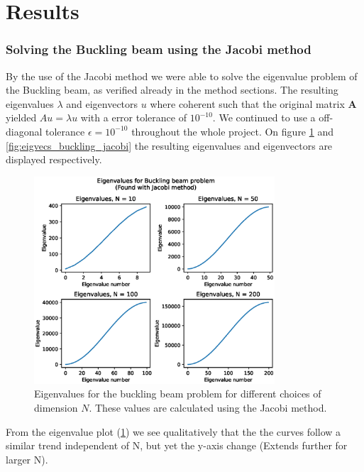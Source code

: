 \documentclass[american,a4paper,12pt]{article}
\renewcommand{\vec}[1]{\mathbf{#1}} %
\begin{document}
\section{Results}
\subsubsection*{Solving the Buckling beam using the Jacobi method}
By the use of the Jacobi method we were able to solve the eigenvalue problem of the Buckling beam, as verified already in the method sections. The resulting eigenvalues $\lambda$ and eigenvectors $u$ where coherent such that the original matrix $\vec{A}$ yielded $Au = \lambda u$ with a error tolerance of $10^{-10}$. We continued to use a off-diagonal tolerance $\epsilon = 10^{-10}$ throughout the whole project. On figure \ref{fig:eigvals_buckling_jacobi} and \ref{fig:eigvecs_buckling_jacobi} the resulting eigenvalues and eigenvectors are displayed respectively.
\begin{figure}[H]
    \centering
    \includegraphics[width = 0.8\textwidth]{figures/eigvals_buckling_jacobi.eps}
    \caption{Eigenvalues for the buckling beam problem for different choices of dimension $N$. These values are calculated using the Jacobi method.}
    \label{fig:eigvals_buckling_jacobi}
\end{figure}
From the eigenvalue plot (\ref{fig:eigvals_buckling_jacobi}) we see qualitatively that the the curves follow a similar trend independent of N, but yet the y-axis change (Extends further for larger N). 
\end{document}
